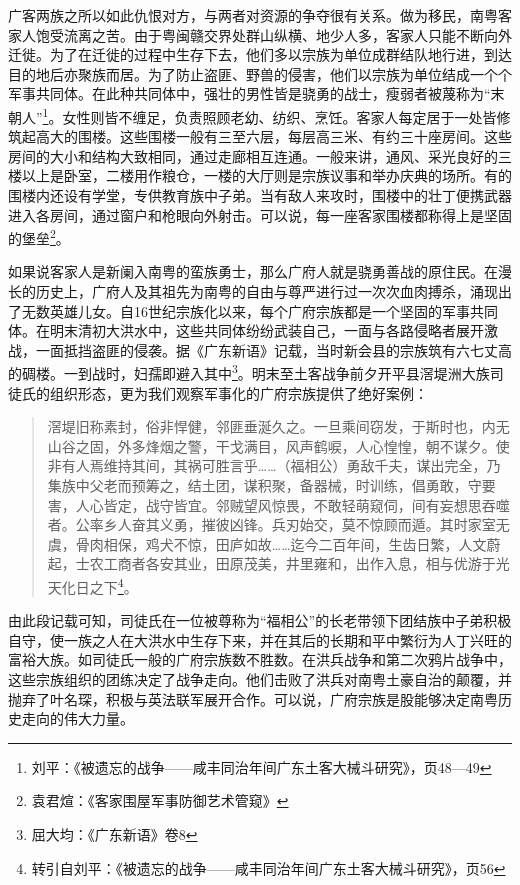 广客两族之所以如此仇恨对方，与两者对资源的争夺很有关系。做为移民，南粤客家人饱受流离之苦。由于粤闽赣交界处群山纵横、地少人多，客家人只能不断向外迁徙。为了在迁徙的过程中生存下去，他们多以宗族为单位成群结队地行进，到达目的地后亦聚族而居。为了防止盗匪、野兽的侵害，他们以宗族为单位结成一个个军事共同体。在此种共同体中，强壮的男性皆是骁勇的战士，瘦弱者被蔑称为“末朝人”\footnote{刘平：《被遗忘的战争——咸丰同治年间广东土客大械斗研究》，页48—49}。女性则皆不缠足，负责照顾老幼、纺织、烹饪。客家人每定居于一处皆修筑起高大的围楼。这些围楼一般有三至六层，每层高三米、有约三十座房间。这些房间的大小和结构大致相同，通过走廊相互连通。一般来讲，通风、采光良好的三楼以上是卧室，二楼用作粮仓，一楼的大厅则是宗族议事和举办庆典的场所。有的围楼内还设有学堂，专供教育族中子弟。当有敌人来攻时，围楼中的壮丁便携武器进入各房间，通过窗户和枪眼向外射击。可以说，每一座客家围楼都称得上是坚固的堡垒\footnote{袁君煊：《客家围屋军事防御艺术管窥》}。

如果说客家人是新阑入南粤的蛮族勇士，那么广府人就是骁勇善战的原住民。在漫长的历史上，广府人及其祖先为南粤的自由与尊严进行过一次次血肉搏杀，涌现出了无数英雄儿女。自16世纪宗族化以来，每个广府宗族都是一个坚固的军事共同体。在明末清初大洪水中，这些共同体纷纷武装自己，一面与各路侵略者展开激战，一面抵挡盗匪的侵袭。据《广东新语》记载，当时新会县的宗族筑有六七丈高的碉楼。一到战时，妇孺即避入其中\footnote{屈大均：《广东新语》卷8}。明末至土客战争前夕开平县滘堤洲大族司徒氏的组织形态，更为我们观察军事化的广府宗族提供了绝好案例：


\begin{quote}

滘堤旧称素封，俗非悍健，邻匪垂涎久之。一旦乘间窃发，于斯时也，内无山谷之固，外多烽烟之警，干戈满目，风声鹤唳，人心惶惶，朝不谋夕。使非有人焉维持其间，其祸可胜言乎……（福相公）勇敌千夫，谋出完全，乃集族中父老而预筹之，结土团，谋积聚，备器械，时训练，倡勇敢，守要害，人心皆定，战守皆宜。邻贼望风惊畏，不敢轻萌窥伺，间有妄想思吞噬者。公率乡人奋其义勇，摧彼凶锋。兵刃始交，莫不惊顾而遁。其时家室无虞，骨肉相保，鸡犬不惊，田庐如故……迄今二百年间，生齿日繁，人文蔚起，士农工商者各安其业，田原茂美，井里雍和，出作入息，相与优游于光天化日之下\footnote{转引自刘平：《被遗忘的战争——咸丰同治年间广东土客大械斗研究》，页56}。
\end{quote}

由此段记载可知，司徒氏在一位被尊称为“福相公”的长老带领下团结族中子弟积极自守，使一族之人在大洪水中生存下来，并在其后的长期和平中繁衍为人丁兴旺的富裕大族。如司徒氏一般的广府宗族数不胜数。在洪兵战争和第二次鸦片战争中，这些宗族组织的团练决定了战争走向。他们击败了洪兵对南粤土豪自治的颠覆，并抛弃了叶名琛，积极与英法联军展开合作。可以说，广府宗族是股能够决定南粤历史走向的伟大力量。

